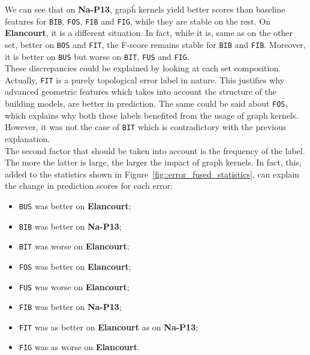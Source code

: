         We can see that on \textbf{Na-P13}, grapĥ kernels yield better scores than baseline features for \texttt{BIB}, \texttt{FOS}, \texttt{FIB} and \texttt{FIG}, while they are stable on the rest.
        On \textbf{Elancourt}, it is a different situation.
        In fact, while it is, same as on the other set, better on \texttt{BOS} and \texttt{FIT}, the F-score remains stable for \texttt{BIB} and \texttt{FIB}.
        Moreover, it is better on \texttt{BUS} but worse on \texttt{BIT}, \texttt{FUS} and \texttt{FIG}.\\

        These discrepancies could be explained by looking at each set composition.
        Actually, \texttt{FIT} is a purely topological error label in nature.
        This justifies why advanced geometric features which takes into account the structure of the building models, are better in prediction.
        The same could be said about \texttt{FOS}, which explains why both these labels benefited from the usage of graph kernels.
        However, it was not the case of \texttt{BIT} which is contradictory with the previous explanation.\\

        The second factor that should be taken into account is the frequency of the label.
        The more the latter is large, the larger the impact of graph kernels.
        In fact, this, added to the statistics shown in Figure~\ref{fig::error_fused_statistics}, can explain the change in prediction scores for each error:
        \begin{itemize}[label=\(\blacktriangleright\)]
            \item \texttt{BUS} was better on \textbf{Elancourt};
            \item \texttt{BIB} was better on \textbf{Na-P13};
            \item \texttt{BIT} was worse on \textbf{Elancourt};
            \item \texttt{FOS} was better on \textbf{Elancourt};
            \item \texttt{FUS} was worse on \textbf{Elancourt};
            \item \texttt{FIB} was better on \textbf{Na-P13};
            \item \texttt{FIT} was as better on \textbf{Elancourt} as on \textbf{Na-P13};
            \item \texttt{FIG} was as worse on \textbf{Elancourt}.
        \end{itemize}
        ~\\

